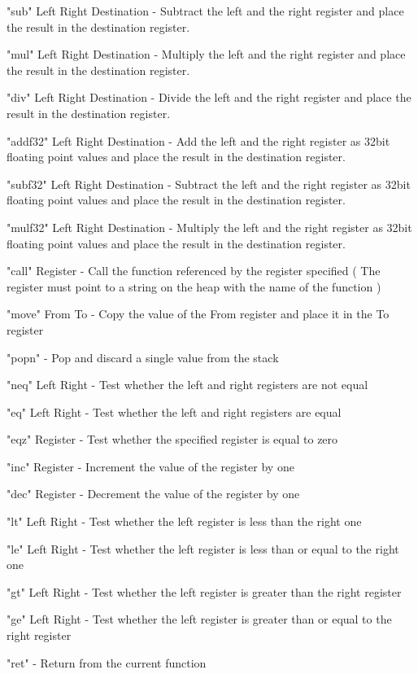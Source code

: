\documentclass[]{final_report}
\begin{document}
"sub" Left Right Destination - Subtract the left and the right register and place the result in the destination register.

"mul" Left Right Destination - Multiply the left and the right register and place the result in the destination register.

"div" Left Right Destination - Divide the left and the right register and place the result in the destination register.

"addf32" Left Right Destination - Add the left and the right register as 32bit floating point values and place the result in the destination register.

"subf32" Left Right Destination - Subtract the left and the right register as 32bit floating point values and place the result in the destination register.

"mulf32" Left Right Destination - Multiply the left and the right register as 32bit floating point values and place the result in the destination register.

"call" Register - Call the function referenced by the register specified ( The register must point to a string on the heap with the name of the function )

"move" From To - Copy the value of the From register and place it in the To register

"popn" - Pop and discard a single value from the stack

"neq" Left Right - Test whether the left and right registers are not equal

"eq" Left Right - Test whether the left and right registers are equal

"eqz" Register - Test whether the specified register is equal to zero

"inc" Register - Increment the value of the register by one

"dec" Register - Decrement the value of the register by one

"lt" Left Right - Test whether the left register is less than the right one

"le" Left Right - Test whether the left register is less than or equal to the right one

"gt" Left Right - Test whether the left register is greater than the right register

"ge" Left Right - Test whether the left register is greater than or equal to the right register

"ret" - Return from the current function
\end{document}
